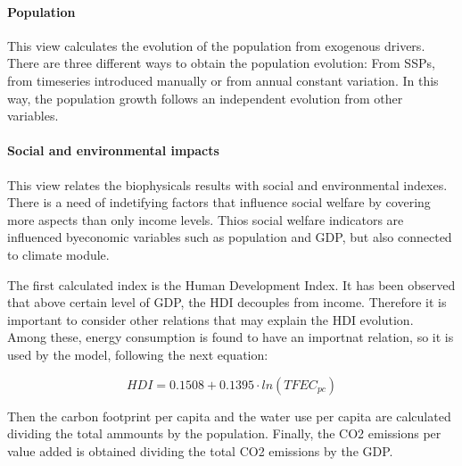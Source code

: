 \paragraph{Population}

This view calculates the evolution of the population from exogenous drivers. There are three different ways to obtain the population evolution: From SSPs, from timeseries introduced manually or from annual constant variation. In this way, the population growth follows an independent evolution from other variables.


\paragraph{Social and environmental impacts}

This view relates the biophysicals results with social and environmental indexes. There is a need of indetifying factors that influence social welfare by covering more aspects than only income levels. Thios social welfare indicators are influenced byeconomic variables such as population and GDP, but also connected to climate module.

The first calculated index is the Human Development Index. It has been observed that above certain level of GDP, the HDI decouples from income. Therefore it is important to consider other relations that may explain the HDI evolution. Among these, energy consumption is found to have an importnat relation, so it is used by the model, following the next equation:

\begin{equation}
    HDI=0.1508+0.1395 \cdot ln(TFEC_{pc})
\end{equation}


Then the carbon footprint per capita and the water use per capita are calculated dividing the total ammounts by the population. Finally, the CO2 emissions per value added is obtained dividing the total CO2 emissions by the GDP.